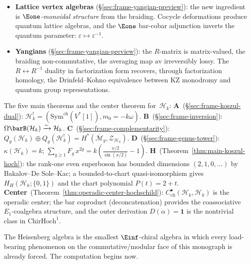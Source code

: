 \begin{itemize}
\item \textbf{Lattice vertex algebras}
 (\S\ref{sec:frame-yangian-preview}): the new ingredient is
 \emph{$\Eone$-monoidal structure} from the braiding. Cocycle
 deformations produce quantum lattice algebras, and the $\Eone$
 bar-cobar adjunction inverts the quantum parameter:
 $\varepsilon \mapsto \varepsilon^{-1}$.

\item \textbf{Yangians} (\S\ref{sec:frame-yangian-preview}): the
 $R$-matrix is matrix-valued, the braiding non-commutative, the
 averaging map $\mathrm{av}$ irreversibly lossy. The
 $R \leftrightarrow R^{-1}$ duality in factorization form recovers,
 through factorization homology, the Drinfeld--Kohno equivalence
 between KZ monodromy and quantum group representations.
\end{itemize}

\begin{remark}%
\label{rem:frame-governing-picture}
The five main theorems and the center theorem for~$\mathcal{H}_k$:
\textbf{A}~(\S\ref{sec:frame-koszul-dual}): $\mathcal{H}_k^! = (\mathrm{Sym}^{\mathrm{ch}}(V^*[1]), m_0 = -k\omega)$.
\textbf{B}~(\S\ref{sec:frame-inversion}): $\Omega\barB(\mathcal{H}_k) \xrightarrow{\sim} \mathcal{H}_k$.
\textbf{C}~(\S\ref{sec:frame-complementarity}): $Q_g(\mathcal{H}_k) \oplus Q_g(\mathcal{H}_k^!) = H^*(\overline{\mathcal{M}}_g, \mathcal{Z}_{\mathcal{H}_k})$.
\textbf{D}~(\S\ref{sec:frame-genus-tower}): $\kappa(\mathcal{H}_k) = k$; $\sum_{g \geq 1} F_g\, x^{2g} = k(\tfrac{x/2}{\sin(x/2)} - 1)$.
\textbf{H}~(Theorem~\ref{thm:main-koszul-hoch}): the rank-one even
superboson has bounded dimensions $(2,1,0,\ldots)$ by
Bakalov--De Sole--Kac; a bounded-to-chart quasi-isomorphism gives
$H_H(\mathcal H_k;\{0,1\})$ and the chart polynomial $P(t)=2+t$.
\textbf{Center}~(Theorem~\ref{thm:operadic-center-hochschild}): $C^\bullet_{\mathrm{ch}}(\mathcal{H}_k, \mathcal{H}_k)$ is the operadic center; the bar coproduct (deconcatenation) provides the coassociative $E_1$-coalgebra structure, and the outer derivation $D(\alpha) = \mathbf{1}$ is the nontrivial class in $\mathrm{ChirHoch}^1$.
\end{remark}

\medskip

The Heisenberg algebra is the smallest $\Einf$-chiral algebra in
which every load-bearing phenomenon on the commutative/modular face
of this monograph is already forced. The computation begins now.

